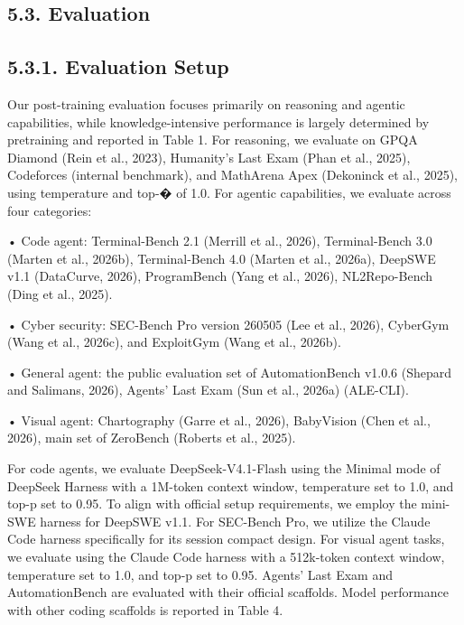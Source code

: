 \documentclass[
  10
]{article}
\begin{document}
\subsection{5.3. Evaluation}\label{evaluation}

\subsection{5.3.1. Evaluation Setup}\label{evaluation-setup}

Our post-training evaluation focuses primarily on reasoning and agentic
capabilities, while knowledge-intensive performance is largely
determined by pretraining and reported in Table 1. For reasoning, we
evaluate on GPQA Diamond (Rein et al., 2023), Humanity's Last Exam (Phan
et al., 2025), Codeforces (internal benchmark), and MathArena Apex
(Dekoninck et al., 2025), using temperature and top-� of 1.0. For
agentic capabilities, we evaluate across four categories:

• Code agent: Terminal-Bench 2.1 (Merrill et al., 2026), Terminal-Bench
3.0 (Marten et al., 2026b), Terminal-Bench 4.0 (Marten et al., 2026a),
DeepSWE v1.1 (DataCurve, 2026), ProgramBench (Yang et al., 2026),
NL2Repo-Bench (Ding et al., 2025).

• Cyber security: SEC-Bench Pro version 260505 (Lee et al., 2026),
CyberGym (Wang et al., 2026c), and ExploitGym (Wang et al., 2026b).

• General agent: the public evaluation set of AutomationBench v1.0.6
(Shepard and Salimans, 2026), Agents' Last Exam (Sun et al., 2026a)
(ALE-CLI).

• Visual agent: Chartography (Garre et al., 2026), BabyVision (Chen et
al., 2026), main set of ZeroBench (Roberts et al., 2025).

For code agents, we evaluate DeepSeek-V4.1-Flash using the Minimal mode
of DeepSeek Harness with a 1M-token context window, temperature set to
1.0, and top-p set to 0.95. To align with official setup requirements,
we employ the mini-SWE harness for DeepSWE v1.1. For SEC-Bench Pro, we
utilize the Claude Code harness specifically for its session compact
design. For visual agent tasks, we evaluate using the Claude Code
harness with a 512k-token context window, temperature set to 1.0, and
top-p set to 0.95. Agents' Last Exam and AutomationBench are evaluated
with their official scaffolds. Model performance with other coding
scaffolds is reported in Table 4.
\end{document}
